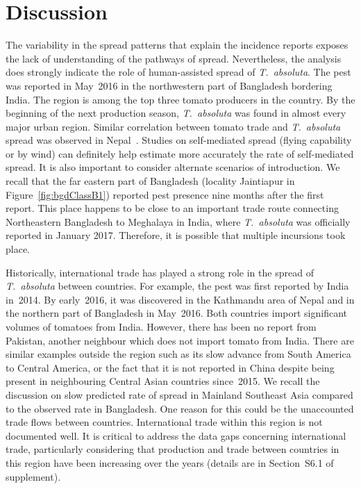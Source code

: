 \documentclass[11pt]{article}
\newcommand{\tuta}{\emph{T.~absoluta}}
\theoremstyle{definition}
\begin{document}
\section{Discussion}
The variability in the spread patterns that explain the incidence reports
exposes the lack of understanding of the pathways of spread.  Nevertheless,
the analysis does strongly indicate the role of human-assisted spread of
\tuta{}. The pest was reported in May~2016 in the northwestern part of
Bangladesh bordering India. The region is among the top three tomato
producers in the country. By the beginning of the next production season,
\tuta{} was found in almost every major urban region.  Similar correlation
between tomato trade and \tuta{} spread was observed in
Nepal~\cite{venkatramanan2019modeling}. Studies on self-mediated spread
(flying capability or by wind) can definitely help estimate more accurately
the rate of self-mediated spread. It is also important to consider
alternate scenarios of introduction. We recall that the far eastern part of
Bangladesh (locality Jaintiapur in Figure~\ref{fig:bgdClassB1}) reported
pest presence nine months after the first report. This place happens to be
close to an important trade route connecting Northeastern Bangladesh to
Meghalaya in India, where \tuta{} was officially reported in January 2017.
Therefore, it is possible that multiple incursions took place. 

Historically, international trade has played a strong role in the spread of
\tuta{} between countries. For example, the pest was first reported by
India in~2014. By early~2016, it was discovered in the Kathmandu area of
Nepal and in the northern part of Bangladesh in May~2016. Both countries import
significant volumes of tomatoes from India. However, there has been no report
from Pakistan, another neighbour which does not import tomato from India.
There are similar examples outside the region such as its slow advance from
South America to Central America, or the fact that it is not reported in
China despite being present in neighbouring Central Asian countries
since~2015.  We recall the discussion on slow predicted rate of spread in
Mainland Southeast Asia compared to the observed rate in Bangladesh. One
reason for this could be the unaccounted trade flows between countries.
International trade within this region is not documented well.  It is
critical to address the data gaps concerning international trade,
particularly considering that production and trade between countries in
this region have been increasing over the years (details are in
Section~S6.1 of supplement).
\end{document}
